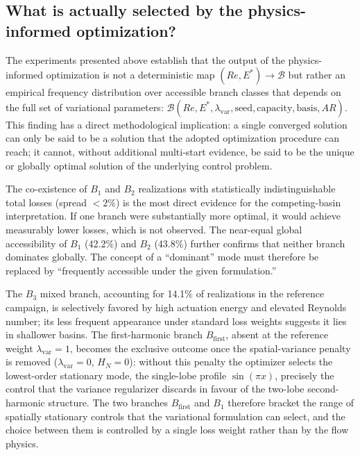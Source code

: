 \documentclass[a4paper,11pt]{article}
\begin{document}
\subsection{What is actually selected by the physics-informed optimization?}

The experiments presented above establish that the output of the physics-informed
optimization is not a deterministic map \((Re,E^*)\to\mathcal{B}\) but rather
an empirical frequency distribution over accessible branch classes that depends
on the full set of variational parameters:
\(\mathcal{B}(Re,E^*,\lambda_{\mathrm{var}},\text{seed},\text{capacity},\text{basis},AR)\).
This finding has a direct methodological implication: a single converged solution
can only be said to be a solution that the adopted optimization procedure can reach;
it cannot, without additional multi-start evidence, be said to be the unique or
globally optimal solution of the underlying control problem.

The co-existence of \(B_1\) and \(B_2\) realizations with statistically
indistinguishable total losses (spread \(<2\%\)) is the most direct evidence for
the competing-basin interpretation. If one branch were substantially more optimal,
it would achieve measurably lower losses, which is not observed. The near-equal
global accessibility of \(B_1\) (42.2\%) and \(B_2\) (43.8\%) further confirms
that neither branch dominates globally. The concept of a ``dominant'' mode must
therefore be replaced by ``frequently accessible under the given formulation.''

The \(B_3\) mixed branch, accounting for 14.1\% of realizations in the reference
campaign, is selectively favored by high actuation energy and elevated Reynolds
number; its less frequent appearance under standard loss weights suggests it lies
in shallower basins. The first-harmonic branch \(B_{\mathrm{first}}\), absent at the
reference weight \(\lambda_{\mathrm{var}}=1\), becomes the exclusive outcome once
the spatial-variance penalty is removed (\(\lambda_{\mathrm{var}}=0\), \(H_N=0\)):
without this penalty the optimizer selects the lowest-order stationary mode, the
single-lobe profile \(\sin(\pi x)\), precisely the control that the variance
regularizer discards in favour of the two-lobe second-harmonic structure. The two
branches \(B_{\mathrm{first}}\) and \(B_1\) therefore bracket the range of spatially
stationary controls that the variational formulation can select, and the choice
between them is controlled by a single loss weight rather than by the flow physics.
\end{document}
